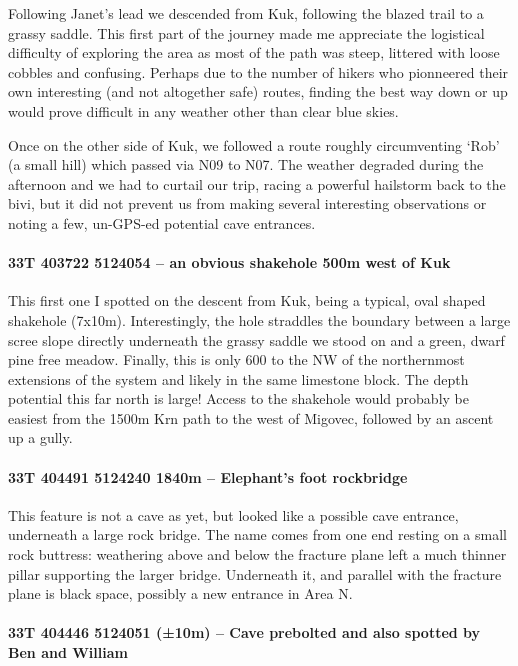 Following Janet’s lead we descended from Kuk, following the blazed trail to a grassy saddle. This first part of the journey made me appreciate the logistical difficulty of exploring the area as most of the path was steep, littered with loose cobbles and confusing. Perhaps due to the number of  hikers who pionneered their own interesting (and not altogether safe) routes, finding the best way down or up would prove difficult in any weather other than clear blue skies. 


Once on the other side of Kuk, we followed a route roughly circumventing ‘Rob’ (a small hill) which passed via N09 to N07. The weather degraded during the afternoon and we had to curtail our trip, racing a powerful hailstorm back to the bivi, but it did not prevent us from making several interesting observations or noting a few, un-GPS-ed potential cave entrances.

\paragraph{33T 403722 5124054 – an obvious shakehole 500m west of Kuk}

This first one I spotted on the descent from Kuk, being a typical, oval shaped shakehole (7x10m). Interestingly, the hole straddles the boundary between a large scree slope directly underneath the grassy saddle we stood on and a green, dwarf pine free meadow.  Finally, this is only 600 to the NW of the northernmost extensions of the system and likely in the same limestone block. The depth potential this far north is large!  Access to the shakehole would probably be easiest from the 1500m Krn path to the west of Migovec, followed by an ascent up a gully. 

\paragraph{33T 404491 5124240  1840m – Elephant’s foot rockbridge}

This feature is not a cave as yet, but looked like a possible cave entrance, underneath a large rock bridge. The name comes from one end resting on a small rock buttress: weathering above and below the fracture plane left a much thinner pillar supporting the larger bridge. Underneath it, and parallel with the fracture plane is black space, possibly a new entrance in Area N.

\paragraph{33T 404446 5124051 (±10m) – Cave prebolted and also spotted by Ben and William}

